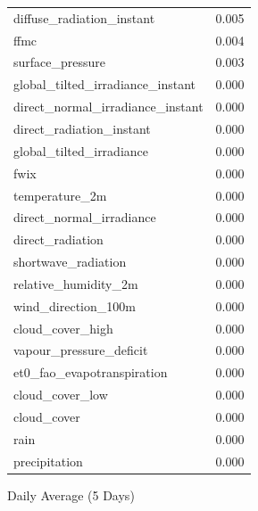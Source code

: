 \begin{table}[H]
\begin{tabular}{lc}
		diffuse\_radiation\_instant             & 0.005       \\ 
		ffmc                                       & 0.004       \\ 
		surface\_pressure                       & 0.003       \\ 
		global\_tilted\_irradiance\_instant      & 0.000       \\ 
		direct\_normal\_irradiance\_instant     & 0.000       \\ 
		direct\_radiation\_instant             & 0.000       \\ 
		global\_tilted\_irradiance             & 0.000       \\ 
		fwix                                       & 0.000       \\ 
		temperature\_2m                       & 0.000       \\ 
		direct\_normal\_irradiance             & 0.000       \\ 
		direct\_radiation                     & 0.000       \\ 
		shortwave\_radiation                  & 0.000       \\ 
		relative\_humidity\_2m                & 0.000       \\ 
		wind\_direction\_100m                 & 0.000       \\ 
		cloud\_cover\_high                    & 0.000       \\ 
		vapour\_pressure\_deficit            & 0.000       \\ 
		et0\_fao\_evapotranspiration       & 0.000       \\ 
		cloud\_cover\_low                     & 0.000       \\ 
		cloud\_cover                         & 0.000       \\ 
		rain                                & 0.000       \\ 
		precipitation                       & 0.000       \\ 
	\end{tabular}
\end{table}

Daily Average (5 Days)

